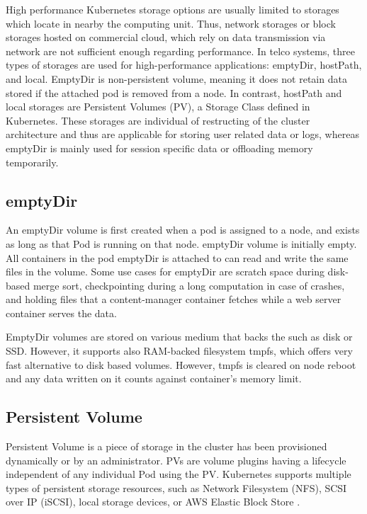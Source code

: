High performance Kubernetes storage options are usually limited to storages which locate in nearby the computing unit. Thus, network storages or block storages hosted on commercial cloud, which rely on data transmission via network are not sufficient enough regarding performance. In telco systems, three types of storages are used for high-performance applications: emptyDir, hostPath, and local. EmptyDir is non-persistent volume, meaning it does not retain data stored if the attached pod is removed from a node. In contrast, hostPath and local storages are Persistent Volumes (PV), a Storage Class defined in Kubernetes. These storages are individual of restructing of the cluster architecture and thus are applicable for storing user related data or logs, whereas emptyDir is mainly used for session specific data or offloading memory temporarily.

\subsection{emptyDir}

An emptyDir volume is first created when a pod is assigned to a node, and exists as long as that Pod is running on that node. emptyDir volume is initially empty. All containers in the pod emptyDir is attached to can read and write the same files in the volume. Some use cases for emptyDir are scratch space during disk-based merge sort, checkpointing during a long computation in case of crashes, and holding files that a content-manager container fetches while a web server container serves the data. \cite{VolumesKubernetes}

EmptyDir volumes are stored on various medium that backs the such as disk or SSD. However, it supports also RAM-backed filesystem tmpfs, which offers very fast alternative to disk based volumes. However, tmpfs is cleared on node reboot and any data written on it counts against container's memory limit. \cite{VolumesKubernetes}

\subsection{Persistent Volume}

Persistent Volume is a piece of storage in the cluster has been provisioned dynamically or by an administrator. PVs are volume plugins having a lifecycle independent of any individual Pod using the PV. Kubernetes supports multiple types of persistent storage resources, such as Network Filesystem (NFS), SCSI over IP (iSCSI), local storage devices, or AWS Elastic Block Store \cite{AmazonEBS}. \cite{PV}

